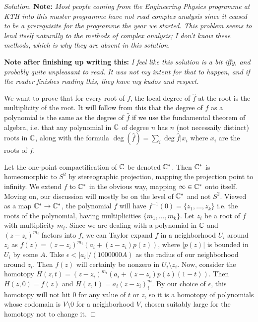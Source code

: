\begin{proof}[Solution]
  \hfill

\textbf{Note:} \textit{Most people coming from the Engineering Physics programme at KTH into this master programme have not read complex analysis since it ceased to be a prerequisite for the programme the year we started. This problem seems to lend itself naturally to the methods of complex analysis; I don't know these methods, which is why they are absent in this solution.}

\textbf{Note after finishing up writing this:} \textit{I feel like this solution is a bit iffy, and probably quite unpleasant to read. It was not my intent for that to happen, and if the reader finishes reading this, they have my kudos and respect.}

 We want to prove that for every root of $f$, the local degree of $\hat{f}$ at the root is the multiplicity of the root. It will follow from this that the degree of $f$ as a polynomial is the same as the degree of $\hat{f}$ if we use the fundamental theorem of algebra, i.e. that any polynomial in $\mathbb{C}$ of degree $n$ has $n$ (not necessaily distinct) roots in $\mathbb{C}$, along with the formula $\deg(\hat{f}) = \sum_i \deg\hat{f}|x_i$ where $x_i$ are the roots of $f$.

Let the one-point compactification of $\mathbb{C}$ be denoted $\mathbb{C}^*$. Then $\mathbb{C}^*$ is homeomorphic to $S^2$ by stereographic projection, mapping the projection point to infinity. We extend $f$ to $\mathbb{C}^*$ in the obvious way, mapping $\infty \in \mathbb{C}^*$ onto itself. Moving on, our discussion will mostly be on the level of $\mathbb{C}^*$ and not $S^2$. Viewed as a map $\mathbb{C}^* \to \mathbb{C}^*$, the polynomial $f$ will have $f^{-1}(0) = \{z_1, \ldots, z_k\}$ i.e. the roots of the polynomial, having multiplicities $\{m_1, \ldots, m_k\}$. Let $z_i$ be a root of $f$ with multiplicity $m_i$. Since we are dealing with a polynomial in $\mathbb{C}$ and $(z-z_i)^{m_i}$ factors into $f$, we can Taylor expand $f$ in a neighborhood $U_i$ around $z_i$ as $f(z) = (z-z_i)^{m_i}(a_i + (z-z_i)p(z))$, where $\lvert p(z)\rvert$ is bounded in $U_i$ by some $A$. Take $\epsilon < \lvert a_i\rvert /(1000000A)$ as the radius of our neighborhood around $z_i$. Then $f(z)$ will certainly be nonzero in $U_i\setminus z_i$. Now, consider the homotopy $H(z, t) = (z-z_i)^{m_i}(a_i + (z-z_i)p(z)(1-t))$. Then $H(z, 0) = f(z)$ and $H(z, 1) = a_i(z-z_i)^m_i$. By our choice of $\epsilon$, this homotopy will not hit 0 for any value of $t$ or $z$, so it is a homotopy of polynomials whose codomain is $V\setminus 0$ for a neighborhood $V$, chosen suitably large for the homotopy not to change it.


\end{proof}
